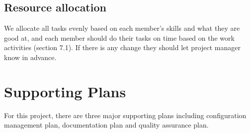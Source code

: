 \documentclass[11pt, a4paper]{article}
\begin{document}
\subsection{Resource allocation}
We allocate all tasks evenly based on each member's skills and what they are good at, and each member should do their tasks on time based on the work activities (section 7.1). If there is any change they should let project manager know in advance.
\newpage

\section{Supporting Plans}
For this project, there are three major supporting plans including configuration management plan, documentation plan and quality assurance plan.
\end{document}
